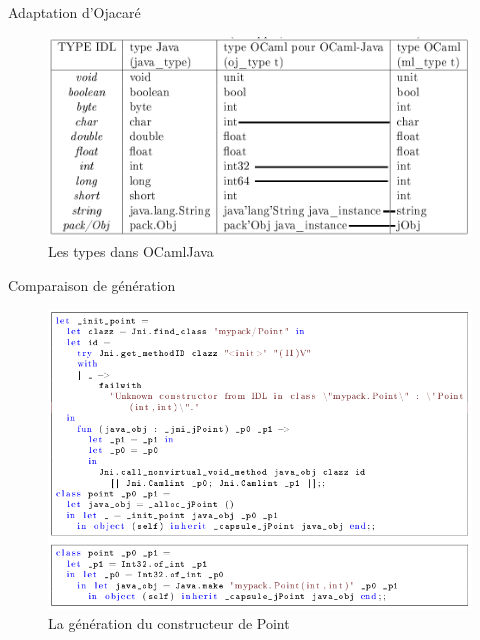 \documentclass{beamer}
\begin{document}
\begin{frame}{Adaptation d'Ojacaré}

\begin{figure}[h]
  \centering
  \includegraphics[scale=0.30]{typesOCamlJava.png}
  \caption{Les types dans OCamlJava}
\end{figure}

\end{frame}

\begin{frame}{Comparaison de génération}
\begin{figure}[h]
  \centering
  \includegraphics[scale=0.35]{exemple.png}
  \caption{La génération du constructeur de Point}
\end{figure}
\end{frame}
\end{document}
